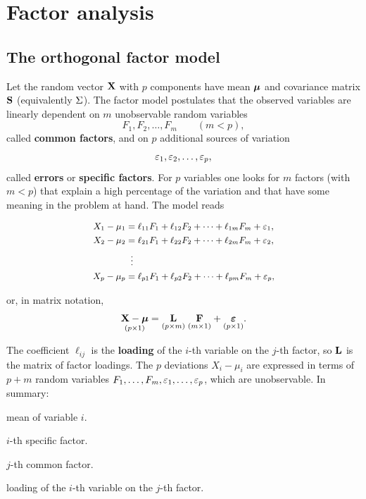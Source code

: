 \section{Factor analysis}
\label{sec:factor_analysis}

\subsection{The orthogonal factor model}
\label{subsec:orthogonal_factor_model}

Let the random vector $\mathbf{X}$ with $p$ components have mean $\boldsymbol{\mu}$ and
covariance matrix $\mathbf{S}$ (equivalently $\Sigma$). The factor model postulates
that the observed variables are linearly dependent on $m$ unobservable random
variables
\[
  F_1,F_2,\dots,F_m \qquad (m<p),
\]
called \textbf{common factors}, and on $p$ additional sources of variation
\[
  \varepsilon_1,\varepsilon_2,\dots,\varepsilon_p,
\]
called \textbf{errors} or \textbf{specific factors}. For $p$ variables one looks
for $m$ factors (with $m<p$) that explain a high percentage of the variation and
that have some meaning in the problem at hand. The model reads

\begin{equation}
  \label{eq:factor_model_rows}
  \small
  \begin{aligned}
    X_1-\mu_1 &= \ell_{11}F_1+\ell_{12}F_2+\dots+\ell_{1m}F_m+\varepsilon_1,\\
    X_2-\mu_2 &= \ell_{21}F_1+\ell_{22}F_2+\dots+\ell_{2m}F_m+\varepsilon_2,\\
              &\;\;\vdots\\
    X_p-\mu_p &= \ell_{p1}F_1+\ell_{p2}F_2+\dots+\ell_{pm}F_m+\varepsilon_p,
  \end{aligned}
\end{equation}

or, in matrix notation,
\begin{equation}
  \label{eq:factor_model_matrix}
  \underset{(p\times 1)}{\mathbf{X}-\boldsymbol{\mu}}
  =\underset{(p\times m)}{\mathbf{L}}\;\underset{(m\times 1)}{\mathbf{F}}
  +\underset{(p\times 1)}{\boldsymbol{\varepsilon}}.
\end{equation}

The coefficient $\ell_{ij}$ is the \textbf{loading} of the $i$-th variable on
the $j$-th factor, so $\mathbf{L}$ is the matrix of factor loadings. The $p$
deviations $X_i-\mu_i$ are expressed in terms of $p+m$ random variables
$F_1,\dots,F_m,\varepsilon_1,\dots,\varepsilon_p$, which are unobservable. In summary:

\begin{description}[leftmargin=2.6em,style=nextline,font=\normalfont]
  \item[$\mu_i$] mean of variable $i$.
  \item[$\ep_i$] $i$-th specific factor.
  \item[$F_j$] $j$-th common factor.
  \item[$\ell_{ij}$] loading of the $i$-th variable on the $j$-th factor.
\end{description}

